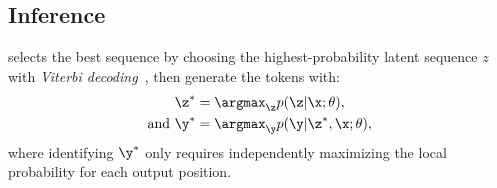 \subsection{Inference} 
\method selects the best sequence by choosing the highest-probability latent sequence $z$ with \textit{Viterbi decoding}~\cite{viterbi1967error}, then generate the tokens with:
\begin{align*}
    \z^{*} &= \argmax_{\z} p(\z|\x;\theta), \\ 
    \text{and}\ \y^{*} &=\argmax_{\y}p(\y|\z^{*},\x;\theta),
\end{align*}
where identifying $\y^{*}$ only requires independently maximizing the local probability for each output position.


